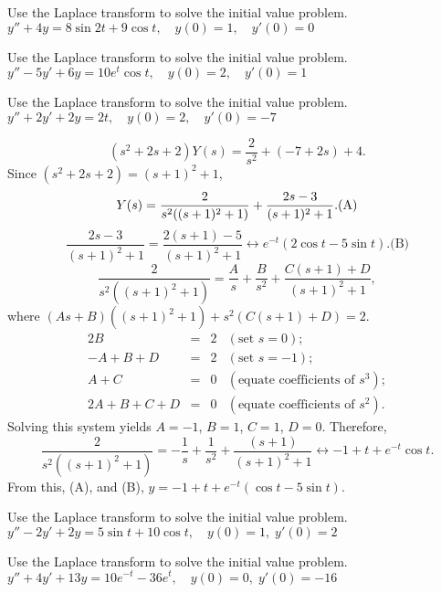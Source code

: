 \documentclass{ximera}
\begin{document}
\begin{problem}\label{exer:8.3.26} Use the Laplace transform to solve the initial value problem.  $y''+4y=8\sin2t+9\cos t, \quad  y(0)=1,\quad y'(0)=0$
\end{problem}

\begin{problem}\label{exer:8.3.27} Use the Laplace transform to solve the initial value problem. $y''-5y'+6y=10e^t\cos t, \quad  y(0)=2,\quad y'(0)=1$
\end{problem}

\begin{problem}\label{exer:8.3.28} Use the Laplace transform to solve the initial value problem. $y''+2y'+2y=2t, \quad  y(0)=2,\quad y'(0)=-7$

\begin{solution}
$$
(s^2+2s+2)Y(s)=\frac{2}{s^2}+(-7+2s)+4.
$$
Since $(s^2+2s+2)=(s+1)^2+1$,
$$
Y(s)=\frac{2}{s^2((s+1)^2+1)}+{2s-3\over (s+1)^2+1}.
\text{(A)}
$$
$$
\frac{2s-3}{(s+1)^2+1}=\frac{2(s+1)-5}{(s+1)^2+1}
\leftrightarrow e^{-t}(2\cos t-5\sin t).
\text{(B)}
$$
$$
\frac{2}{s^2((s+1)^2+1)}=\frac{A}{s}+\frac{B}{s^2}+\frac{C(s+1)+D}{(s+1)^2+1},
$$
where
$(As+B)\left((s+1)^2+1\right)+s^2\left(C(s+1)+D\right)=2$.
$$
\begin{array}{rcll}
2B&=&2&(\mbox{set }s=0);\\
-A+B+D&=&2&(\mbox{set }s=-1);\\
A+C&=&0&(\mbox{equate coefficients of }s^3);\\
2A+B+C+D&=&0&(\mbox{equate coefficients of }s^2).
\end{array}
$$
Solving this system yields $A=-1$, $B=1$, $C=1$, $D=0$. Therefore,
$$
\frac{2}{s^2((s+1)^2+1)}=-\frac{1}{s}+\frac{1}{s^2}+\frac{(s+1)}{(s+1)^2+1}\leftrightarrow-1+t+e^{-t}\cos t.
$$
From this, (A), and (B),
$y=-1+t+e^{-t}(\cos t-5\sin t)$.

\end{solution}
\end{problem}

\begin{problem}\label{exer:8.3.29} Use the Laplace transform to solve the initial value problem. $y''-2y'+2y=5\sin t+10\cos t, \quad  y(0)=1,\;
y'(0)=2$
\end{problem}

\begin{problem}\label{exer:8.3.30} Use the Laplace transform to solve the initial value problem. $y''+4y'+13y=10e^{-t}-36e^t, \quad  y(0)=0,\;
y'(0)=-16$
\end{problem}
\end{document}
